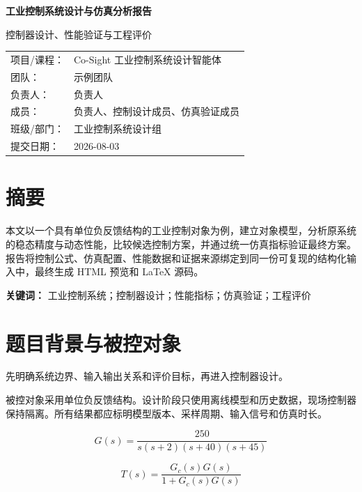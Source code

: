 \documentclass[UTF8,a4paper,12pt]{ctexart}
\begin{document}
\begin{titlepage}
  \thispagestyle{empty}
  \centering
  \vspace*{2.4cm}
  {\bfseries\textcolor{deepblue}{工业控制系统设计与仿真分析报告}\par}
  \vspace{1.2cm}
  { 控制器设计、性能验证与工程评价\par}
  \vfill
  \begin{tabular}{p{3.1cm}p{8.5cm}}
    项目/课程：& Co-Sight 工业控制系统设计智能体\\[0.65em]
    团队：& 示例团队\\[0.65em]
    负责人：& 负责人\\[0.65em]
    成员：& 负责人、控制设计成员、仿真验证成员\\[0.65em]
    班级/部门：& 工业控制系统设计组\\[0.65em]
    提交日期：& 2026-08-03\\[0.65em]
  \end{tabular}
  \vspace*{1cm}
\end{titlepage}
\clearpage
{}
\pagestyle{plain}
\tableofcontents
\clearpage
{}
\pagestyle{fancy}
\section*{摘要}
本文以一个具有单位负反馈结构的工业控制对象为例，建立对象模型，分析原系统的稳态精度与动态性能，比较候选控制方案，并通过统一仿真指标验证最终方案。报告将控制公式、仿真配置、性能数据和证据来源绑定到同一份可复现的结构化输入中，最终生成 HTML 预览和 LaTeX 源码。
\par
\noindent\textbf{关键词：} 工业控制系统；控制器设计；性能指标；仿真验证；工程评价
\clearpage
\section{题目背景与被控对象}\label{sec:model}
先明确系统边界、输入输出关系和评价目标，再进入控制器设计。
\par
被控对象采用单位负反馈结构。设计阶段只使用离线模型和历史数据，现场控制器保持隔离。所有结果都应标明模型版本、采样周期、输入信号和仿真时长。


\begin{equation}
G(s)=\frac{250}{s(s+2)(s+40)(s+45)}
\label{eq:plant}
\end{equation}

\begin{equation}
T(s)=\frac{G_c(s)G(s)}{1+G_c(s)G(s)}
\label{eq:closed_loop}
\end{equation}
\end{document}
